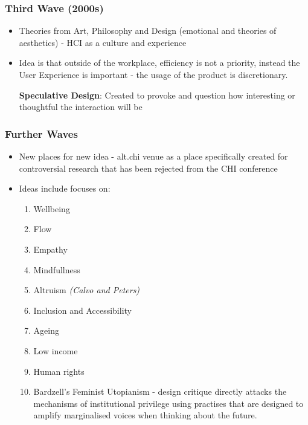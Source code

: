 \documentclass{article}
\newenvironment{definition}{\par\color{blue}}{\par}
\begin{document}
\subsubsection{Third Wave (2000s)}
\begin{itemize}
    \item Theories from Art, Philosophy and Design (emotional and theories of aesthetics) - HCI as a culture and experience
    \item Idea is that outside of the workplace, efficiency is not a priority, instead the User Experience is important - the usage of the product is discretionary.
    
    \begin{definition}
    \textbf{Speculative Design}: Created to provoke and question how interesting or thoughtful the interaction will be
    \end{definition}
    
\end{itemize}
\subsubsection{Further Waves}
\begin{itemize}
    \item New places for new idea - alt.chi venue as a place specifically created for controversial research that has been rejected from the CHI conference
    \item Ideas include focuses on:
    \begin{enumerate}
        \item Wellbeing
        \item Flow
        \item Empathy
        \item Mindfullness
        \item Altruism \textit{(Calvo and Peters)}
        \item Inclusion and Accessibility
        \item Ageing
        \item Low income
        \item Human rights
        \item Bardzell's Feminist Utopianism - design critique directly attacks the mechanisms of institutional privilege using practises that are designed to amplify marginalised voices when thinking about the future.
    \end{enumerate}
\end{itemize}
\end{document}
